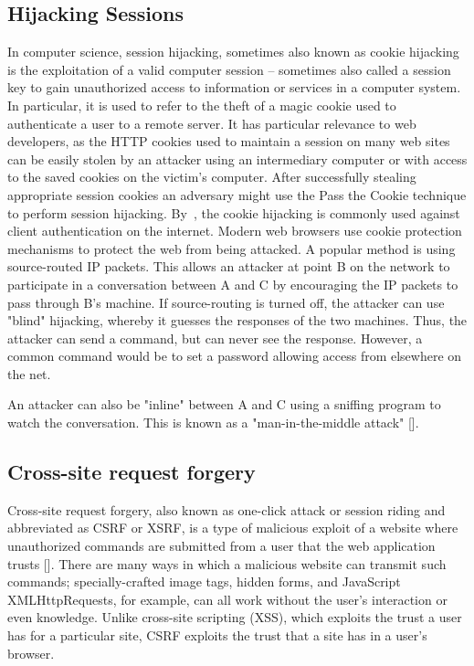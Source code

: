 \subsection{Hijacking Sessions}\label{subsec:hijacking-sessions}
In computer science, session hijacking, sometimes also known as cookie hijacking is the exploitation of a valid computer
session -- sometimes also called a session key to gain unauthorized access to information or services in a computer system.
In particular, it is used to refer to the theft of a magic cookie used to authenticate a user to a remote server.
It has particular relevance to web developers, as the HTTP cookies used to maintain a session on many web sites
can be easily stolen by an attacker using an intermediary computer or with access to the saved cookies on the victim's
computer.
After successfully stealing appropriate session cookies an adversary might use the Pass the Cookie technique to perform
session hijacking.
By~\cite{bugliesi2015cookiext}, the cookie hijacking is commonly used against client authentication on the internet.
Modern web browsers use cookie protection mechanisms to protect the web from being attacked.
A popular method is using source-routed IP packets.
This allows an attacker at point B on the network to participate in a conversation between A and C by encouraging the
IP packets to pass through B's machine.
If source-routing is turned off, the attacker can use "blind" hijacking, whereby it guesses the responses of the two
machines.
Thus, the attacker can send a command, but can never see the response.
However, a common command would be to set a password allowing access from elsewhere on the net.

An attacker can also be "inline" between A and C using a sniffing program to watch the conversation.
This is known as a "man-in-the-middle attack" [\cite{callegati2009man}].

\subsection{Cross-site request forgery}\label{subsec:cross-site-request-forgery}
Cross-site request forgery, also known as one-click attack or session riding and abbreviated as CSRF or XSRF,
is a type of malicious exploit of a website where unauthorized commands are submitted from a user that the web
application trusts [\cite{barth2008robust}].
There are many ways in which a malicious website can transmit such commands;
specially-crafted image tags, hidden forms, and JavaScript XMLHttpRequests, for example, can all work without
the user's interaction or even knowledge.
Unlike cross-site scripting (XSS), which exploits the trust a user has for a particular site,
CSRF exploits the trust that a site has in a user's browser.

